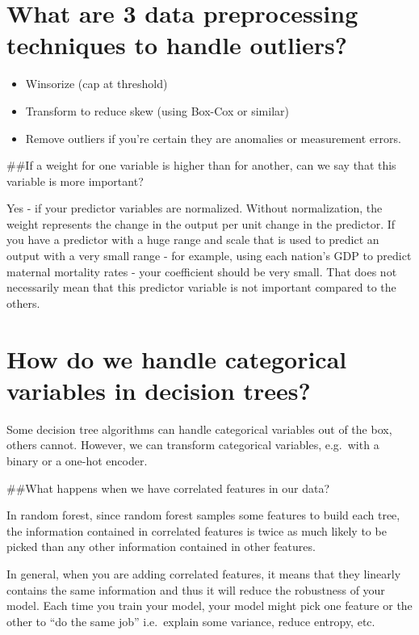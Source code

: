 \documentclass[
]{book}
\begin{document}
\hypertarget{what-are-3-data-preprocessing-techniques-to-handle-outliers}{%
\section{What are 3 data preprocessing techniques to handle outliers?}\label{what-are-3-data-preprocessing-techniques-to-handle-outliers}}

\begin{itemize}
\item
  Winsorize (cap at threshold)
\item
  Transform to reduce skew (using Box-Cox or similar)
\item
  Remove outliers if you're certain they are anomalies or measurement errors.
\end{itemize}

\#\#If a weight for one variable is higher than for another, can we say that this variable is more important?

Yes - if your predictor variables are normalized.
Without normalization, the weight represents the change in the output per unit change in the predictor. If you have a predictor with a huge range and scale that is used to predict an output with a very small range - for example, using each nation's GDP to predict maternal mortality rates - your coefficient should be very small. That does not necessarily mean that this predictor variable is not important compared to the others.

\hypertarget{how-do-we-handle-categorical-variables-in-decision-trees}{%
\section{How do we handle categorical variables in decision trees?}\label{how-do-we-handle-categorical-variables-in-decision-trees}}

Some decision tree algorithms can handle categorical variables out of the box, others cannot. However, we can transform categorical variables, e.g.~with a binary or a one-hot encoder.

\#\#What happens when we have correlated features in our data?

In random forest, since random forest samples some features to build each tree, the information contained in correlated features is twice as much likely to be picked than any other information contained in other features.

In general, when you are adding correlated features, it means that they linearly contains the same information and thus it will reduce the robustness of your model. Each time you train your model, your model might pick one feature or the other to ``do the same job'' i.e.~explain some variance, reduce entropy, etc.
\end{document}
